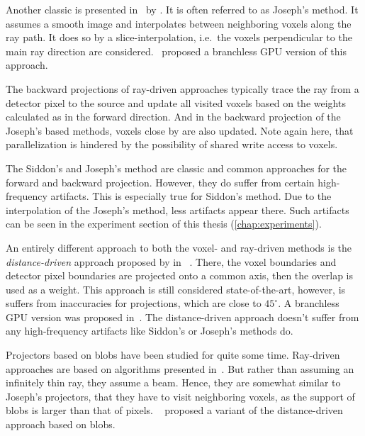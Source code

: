 Another classic is presented in~\cite{joseph_improved_1982} by \citeauthor{joseph_improved_1982}. It
is often referred to as Joseph's method. It assumes a smooth image and interpolates between
neighboring voxels along the ray path. It does so by a slice-interpolation, i.e.\ the voxels
perpendicular to the main ray direction are considered.~\cite{graetz_high_2020} proposed a
branchless \gls{GPU} version of this approach.

The backward projections of ray-driven approaches typically trace the ray from a detector pixel to
the source and update all visited voxels based on the weights calculated as in the forward
direction. And in the backward projection of the Joseph's based methods, voxels close by are also
updated. Note again here, that parallelization is hindered by the possibility of shared write access
to voxels.

The Siddon's and Joseph's method are classic and common approaches for the forward and backward
projection. However, they do suffer from certain high-frequency artifacts. This is especially true
for Siddon's method. Due to the interpolation of the Joseph's method, less artifacts appear there.
Such artifacts can be seen in the experiment section of this thesis (\autoref{chap:experiments}).

An entirely different approach to both the voxel- and ray-driven methods is the
\textit{distance-driven} approach proposed by \citeauthor*{de_man_distance-driven_2002} in
~\cite{de_man_distance-driven_2002,de_man_distance-driven_2004}. There, the voxel boundaries and
detector pixel boundaries are projected onto a common axis, then the overlap is used as a weight.
This approach is still considered state-of-the-art, however, is suffers from inaccuracies for
projections, which are close to \(45^\circ\). A branchless \gls{GPU} version was proposed
in~\cite{liu_gpu-based_2017}. The distance-driven approach doesn't suffer from any high-frequency
artifacts like Siddon's or Joseph's methods do.

Projectors based on blobs have been studied for quite some time. Ray-driven approaches are based on
algorithms presented in~\cite{matej_practical_1996,popescu_ray_2004}. But rather than assuming an
infinitely thin ray, they assume a beam. Hence, they are somewhat similar to Joseph's projectors,
that they have to visit neighboring voxels, as the support of blobs is larger than that of pixels.
~\cite{levakhina_distance-driven_2010} proposed a variant of the distance-driven approach based on
blobs.

